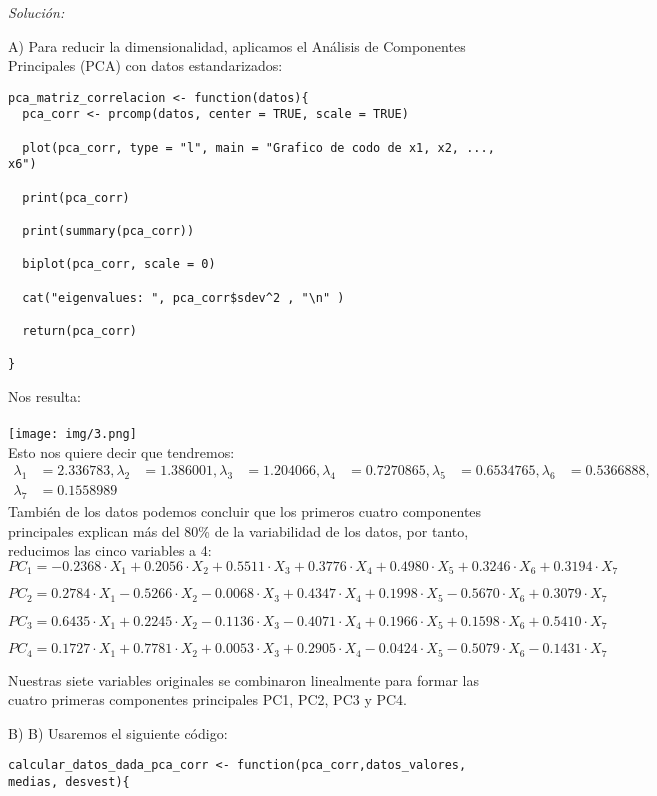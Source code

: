 \documentclass[12pt]{article}
\newenvironment{sol}
    {\emph{Solución:}
    }
    {
    }
\begin{document}
\begin{sol}
A) Para reducir la dimensionalidad, aplicamos el Análisis de Componentes Principales (PCA) con datos estandarizados:
\begin{verbatim}
pca_matriz_correlacion <- function(datos){
  pca_corr <- prcomp(datos, center = TRUE, scale = TRUE)

  plot(pca_corr, type = "l", main = "Grafico de codo de x1, x2, ..., x6")

  print(pca_corr)

  print(summary(pca_corr))

  biplot(pca_corr, scale = 0)

  cat("eigenvalues: ", pca_corr$sdev^2 , "\n" )

  return(pca_corr)

}
\end{verbatim}
Nos resulta:\\\\
\texttt{[image: img/3.png]}\\
Esto nos quiere decir que tendremos:
\begin{align*}
\lambda_1 &= 2.336783,
\lambda_2 &= 1.386001,
\lambda_3 &= 1.204066, 
\lambda_4 &= 0.7270865, 
\lambda_5 &= 0.6534765, 
\lambda_6 &= 0.5366888, \\
\lambda_7 &= 0.1558989
\end{align*}
También de los datos podemos concluir que los primeros cuatro componentes principales explican más del 80\% de la variabilidad de los datos, por tanto, reducimos las cinco variables a 4:
\[
PC_1 = -0.2368 \cdot X_1 + 0.2056 \cdot X_2 + 0.5511 \cdot X_3 + 0.3776 \cdot X_4 + 0.4980 \cdot X_5 + 0.3246 \cdot X_6 + 0.3194 \cdot X_7
\]

\[
PC_2 = 0.2784 \cdot X_1 - 0.5266 \cdot X_2 - 0.0068 \cdot X_3 + 0.4347 \cdot X_4 + 0.1998 \cdot X_5 - 0.5670 \cdot X_6 + 0.3079 \cdot X_7
\]

\[
PC_3 = 0.6435 \cdot X_1 + 0.2245 \cdot X_2 - 0.1136 \cdot X_3 - 0.4071 \cdot X_4 + 0.1966 \cdot X_5 + 0.1598 \cdot X_6 + 0.5410 \cdot X_7
\]

\[
PC_4 = 0.1727 \cdot X_1 + 0.7781 \cdot X_2 + 0.0053 \cdot X_3 + 0.2905 \cdot X_4 - 0.0424 \cdot X_5 - 0.5079 \cdot X_6 - 0.1431 \cdot X_7
\]

Nuestras siete variables originales se combinaron linealmente para formar las cuatro primeras componentes principales PC1, PC2, PC3 y PC4.

\pagebreak

B) B) Usaremos el siguiente código: 
\begin{verbatim}
calcular_datos_dada_pca_corr <- function(pca_corr,datos_valores, medias, desvest){


\end{verbatim}
\end{sol}
\end{document}
